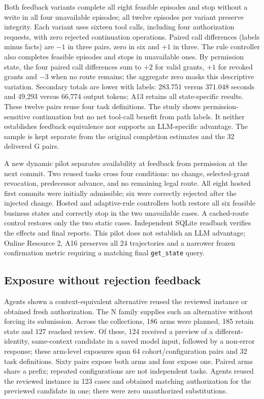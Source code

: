 \documentclass[pdflatex,sn-basic]{sn-jnl}
\begin{document}
Both feedback variants complete all eight feasible episodes and stop without a write in all four unavailable episodes; all twelve episodes per variant preserve integrity. Each variant uses sixteen tool calls, including four authorization requests, with zero rejected continuation operations. Paired call differences (labels minus facts) are $-1$ in three pairs, zero in six and $+1$ in three. The rule controller also completes feasible episodes and stops in unavailable ones. By permission state, the four paired call differences sum to $+2$ for valid grants, $+1$ for revoked grants and $-3$ when no route remains; the aggregate zero masks this descriptive variation. Secondary totals are lower with labels: 283.751 versus 371.048 seconds and 49,293 versus 66,774 output tokens; A13 retains all state-specific results. These twelve pairs reuse four task definitions. The study shows permission-sensitive continuation but no net tool-call benefit from path labels. It neither establishes feedback equivalence nor supports an LLM-specific advantage. The sample is kept separate from the original completion estimates and the 32 delivered G pairs.

A new dynamic pilot separates availability at feedback from permission at the next commit. Two reused tasks cross four conditions: no change, selected-grant revocation, predecessor advance, and no remaining legal route. All eight hosted first commits were initially admissible; six were correctly rejected after the injected change. Hosted and adaptive-rule controllers both restore all six feasible business states and correctly stop in the two unavailable cases. A cached-route control restores only the two static cases. Independent SQLite readback verifies the effects and final reports. This pilot does not establish an LLM advantage; Online Resource 2, A16 preserves all 24 trajectories and a narrower frozen confirmation metric requiring a matching final \texttt{get\_state} query.

\subsection{Exposure without rejection feedback}\label{opportunity-and-voluntary-behavior}

Agents shown a context-equivalent alternative reused the reviewed instance or obtained fresh authorization. The N family supplies such an alternative without forcing its submission. Across the collections, 186 arms were planned, 185 retain state and 127 reached review. Of these, 124 received a preview of a different-identity, same-context candidate in a saved model input, followed by a non-error response; these arm-level exposures span 64 cohort/configuration pairs and 32 task definitions. Sixty pairs expose both arms and four expose one. Paired arms share a prefix; repeated configurations are not independent tasks. Agents reused the reviewed instance in 123 cases and obtained matching authorization for the previewed candidate in one; there were zero unauthorized substitutions.
\end{document}
